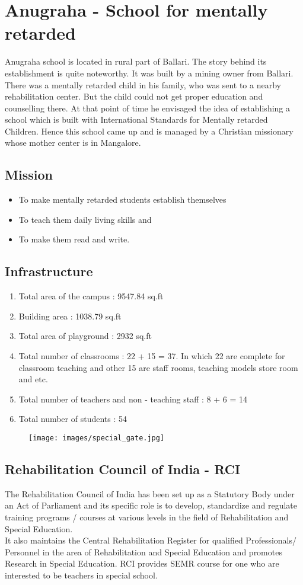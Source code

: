 \section{Anugraha - School for mentally retarded}
Anugraha school is located in rural part of Ballari. The story behind its establishment is quite noteworthy. It was built by a mining owner from Ballari. There was a mentally retarded child in his family, who was sent to a nearby rehabilitation center. But the child could not get proper education and counselling there. At that point of time he envisaged the idea of establishing a school which is built with International Standards for Mentally retarded Children. Hence this school came up and is managed by a Christian missionary whose mother center is in Mangalore. 
\subsection{Mission}
\begin{itemize}
    \item To make mentally retarded students establish themselves
    \item To teach them daily living skills and 
    \item To make them read and write.
\end{itemize}
\subsection{Infrastructure}
\begin{enumerate}
    \item Total area of the campus : 9547.84 sq.ft
    \item Building area : 1038.79 sq.ft
    \item Total area of playground : 2932 sq.ft
    \item Total number of classrooms : 22 + 15 = 37. In which 22 are complete for classroom teaching and other 15 are staff rooms, teaching models store room and etc.
    \item Total number of teachers and non - teaching staff : 8 + 6 = 14
    \item Total number of students : 54
\end{enumerate}
\begin{figure}[H]
    \centering
    \texttt{[image: images/special\_gate.jpg]}
\end{figure}
\subsection{Rehabilitation Council of India - RCI}
The Rehabilitation Council of India has been set up as a Statutory Body under an Act of Parliament and its specific role is to develop, standardize and regulate training programs / courses at various levels in the field of Rehabilitation and Special Education.\\ 
It also maintains the Central Rehabilitation Register for qualified Professionals/ Personnel in the area of Rehabilitation and Special Education and promotes Research in Special Education. RCI provides SEMR course for one who are interested to be teachers in special school.
